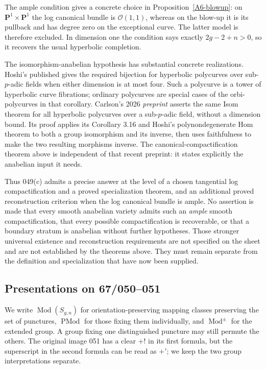 The ample condition gives a concrete choice in Proposition~\ref{A6-blowup}: on $\mathbf P^1\times\mathbf P^1$ the log canonical bundle is $\mathcal O(1,1)$, whereas on the blow-up it is its pullback and has degree zero on the exceptional curve. The latter model is therefore excluded. In dimension one the condition says exactly $2g-2+n>0$, so it recovers the usual hyperbolic completion.

The isomorphism-anabelian hypothesis has substantial concrete realizations. Hoshi's published \cite[Corollary 3.18]{Hoshi2014A567} gives the required bijection for hyperbolic polycurves over sub-$p$-adic fields when either dimension is at most four. Such a polycurve is a tower of hyperbolic curve fibrations; ordinary polycurves are special cases of the orbi-polycurves in that corollary. Carlson's 2026 \emph{preprint} \cite[Theorem A = Theorem 3.11]{Carlson2026A567} asserts the same Isom theorem for all hyperbolic polycurves over a sub-$p$-adic field, without a dimension bound. Its proof applies its Corollary 3.16 and Hoshi's polynondegenerate Hom theorem to both a group isomorphism and its inverse, then uses faithfulness to make the two resulting morphisms inverse. The canonical-compactification theorem above is independent of that recent preprint: it states explicitly the anabelian input it needs.

Thus 049(c) admits a precise answer at the level of a chosen tangential log compactification and a proved specialization theorem, and an additional proved reconstruction criterion when the log canonical bundle is ample. No assertion is made that every smooth anabelian variety admits such an \emph{ample} smooth compactification, that every possible compactification is recoverable, or that a boundary stratum is anabelian without further hypotheses. Those stronger universal existence and reconstruction requirements are not specified on the sheet and are not established by the theorems above. They must remain separate from the definition and specialization that have now been supplied.



\subsection{Presentations on 67/050--051}
We write $\operatorname{Mod}(S_{g,n})$ for orientation-preserving mapping classes preserving the set of punctures, $\operatorname{PMod}$ for those fixing them individually, and $\operatorname{Mod}^{\pm}$ for the extended group. A group fixing one distinguished puncture may still permute the others. The original image 051 has a clear $+!$ in its first formula, but the superscript in the second formula can be read as $+'$; we keep the two group interpretations separate.

